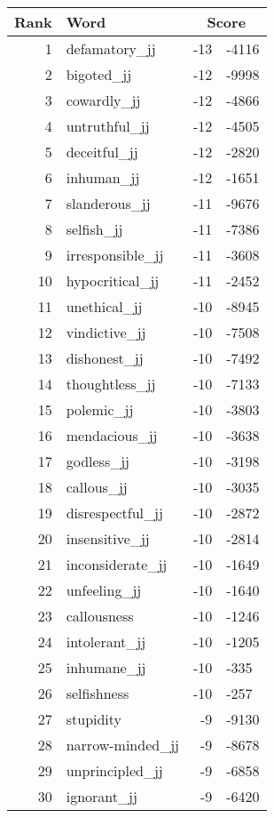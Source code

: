 \begin{longtable}[!htbp]{| rlr@{.}l |}
    \hline
    \textbf{Rank} & \textbf{Word} & \multicolumn{2}{c|}{\textbf{Score}} \\
    \hline
    \endhead
    1 & defamatory\_jj & -13 & -4116 \\
    2 & bigoted\_jj & -12 & -9998 \\
    3 & cowardly\_jj & -12 & -4866 \\
    4 & untruthful\_jj & -12 & -4505 \\
    5 & deceitful\_jj & -12 & -2820 \\
    6 & inhuman\_jj & -12 & -1651 \\
    7 & slanderous\_jj & -11 & -9676 \\
    8 & selfish\_jj & -11 & -7386 \\
    9 & irresponsible\_jj & -11 & -3608 \\
    10 & hypocritical\_jj & -11 & -2452 \\
    11 & unethical\_jj & -10 & -8945 \\
    12 & vindictive\_jj & -10 & -7508 \\
    13 & dishonest\_jj & -10 & -7492 \\
    14 & thoughtless\_jj & -10 & -7133 \\
    15 & polemic\_jj & -10 & -3803 \\
    16 & mendacious\_jj & -10 & -3638 \\
    17 & godless\_jj & -10 & -3198 \\
    18 & callous\_jj & -10 & -3035 \\
    19 & disrespectful\_jj & -10 & -2872 \\
    20 & insensitive\_jj & -10 & -2814 \\
    21 & inconsiderate\_jj & -10 & -1649 \\
    22 & unfeeling\_jj & -10 & -1640 \\
    23 & callousness & -10 & -1246 \\
    24 & intolerant\_jj & -10 & -1205 \\
    25 & inhumane\_jj & -10 & -335 \\
    26 & selfishness & -10 & -257 \\
    27 & stupidity & -9 & -9130 \\
    28 & narrow-minded\_jj & -9 & -8678 \\
    29 & unprincipled\_jj & -9 & -6858 \\
    30 & ignorant\_jj & -9 & -6420 \\

\end{longtable}
